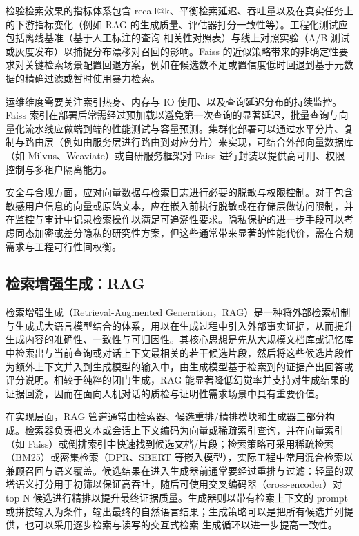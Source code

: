 检验检索效果的指标体系包含 recall@k、平衡检索延迟、吞吐量以及在真实任务上的下游指标变化（例如 RAG 的生成质量、评估器打分一致性等）。工程化测试应包括离线基准（基于人工标注的查询-相关性对照表）与线上对照实验（A/B 测试或灰度发布）以捕捉分布漂移对召回的影响。Faiss 的近似策略带来的非确定性要求对关键检索场景配置回退方案，例如在候选数不足或置信度低时回退到基于元数据的精确过滤或暂时使用暴力检索。

运维维度需要关注索引热身、内存与 IO 使用、以及查询延迟分布的持续监控。Faiss 索引在部署后常需经过预加载以避免第一次查询的显著延迟，批量查询与向量化流水线应做端到端的性能测试与容量预测。集群化部署可以通过水平分片、复制与路由层（例如由服务层进行路由到对应分片）来实现，可结合外部向量数据库（如 Milvus、Weaviate）或自研服务框架对 Faiss 进行封装以提供高可用、权限控制与多租户隔离能力\cite{10.1007/s00778-024-00864-x}。

安全与合规方面，应对向量数据与检索日志进行必要的脱敏与权限控制。对于包含敏感用户信息的向量或原始文本，应在嵌入前执行脱敏或在存储层做访问限制，并在监控与审计中记录检索操作以满足可追溯性要求。隐私保护的进一步手段可以考虑同态加密或差分隐私的研究性方案，但这些通常带来显著的性能代价，需在合规需求与工程可行性间权衡。
\subsection{检索增强生成：RAG}
检索增强生成（Retrieval-Augmented Generation，RAG）是一种将外部检索机制与生成式大语言模型结合的体系，用以在生成过程中引入外部事实证据，从而提升生成内容的准确性、一致性与可归因性。其核心思想是先从大规模文档库或记忆库中检索出与当前查询或对话上下文最相关的若干候选片段，然后将这些候选片段作为额外上下文并入到生成模型的输入中，由生成模型基于检索到的证据产出回答或评分说明。相较于纯粹的闭门生成，RAG 能显著降低幻觉率并支持对生成结果的证据回溯，因而在面向人机对话的质检与证明性需求场景中具有重要价值\cite{lewis2021retrievalaugmentedgenerationknowledgeintensivenlp}。

在实现层面，RAG 管道通常由检索器、候选重排/精排模块和生成器三部分构成。检索器负责把文本或会话上下文编码为向量或稀疏索引查询，并在向量索引（如 Faiss）或倒排索引中快速找到候选文档/片段；检索策略可采用稀疏检索（BM25）或密集检索（DPR、SBERT 等嵌入模型），实际工程中常用混合检索以兼顾召回与语义覆盖。候选结果在进入生成器前通常要经过重排与过滤：轻量的双塔语义打分用于初筛以保证高吞吐，随后可使用交叉编码器（cross-encoder）对 top-N 候选进行精排以提升最终证据质量。生成器则以带有检索上下文的 prompt 或拼接输入为条件，输出最终的自然语言结果；生成策略可以是把所有候选并列提供，也可以采用逐步检索与读写的交互式检索-生成循环以进一步提高一致性。


